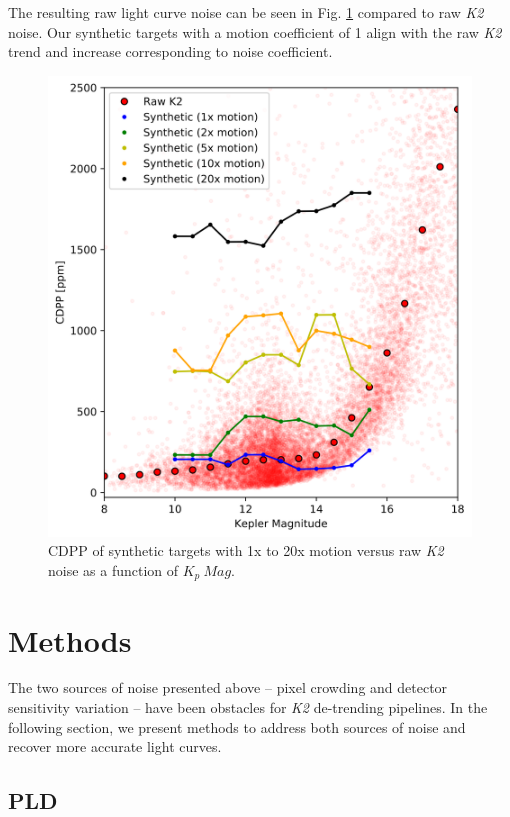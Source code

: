 \documentclass[12pt,preprint]{aastex}
\begin{document}
The resulting raw light curve noise can be seen in Fig. \ref{fig:rawmotion} compared to raw \textit{K2} noise. Our synthetic targets with a motion coefficient of 1 align with the raw \textit{K2} trend and increase corresponding to noise coefficient.

\begin{figure}[h]
	\centering
	\includegraphics[width=1.0\linewidth]{rawmotion.png}
	\caption{CDPP of synthetic targets with 1x to 20x motion versus raw \textit{K2} noise as a function of $K_p\ Mag$.}
	\label{fig:rawmotion}
\end{figure}

\section{Methods}

The two sources of noise presented above -- pixel crowding and detector sensitivity variation -- have been obstacles for \textit{K2} de-trending pipelines. In the following section, we present methods to address both sources of noise and recover more accurate light curves.

\subsection{PLD}
\end{document}

